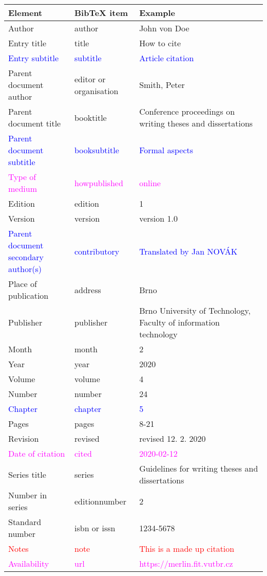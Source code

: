 \begin{tabularx}{\linewidth}{X X X}
    Element & BibTeX item & Example\\\hline
    Author & author & John von Doe\\
    Entry title & title & How to cite\\
    \textcolor{blue}{Entry subtitle} & \textcolor{blue}{subtitle} & \textcolor{blue}{Article citation}\\
    Parent document author & editor or organisation & Smith, Peter\\
    Parent document title & booktitle & Conference proceedings on writing theses and dissertations\\
    \textcolor{blue}{Parent document subtitle} & \textcolor{blue}{booksubtitle} & \textcolor{blue}{Formal aspects}\\
    \textcolor{magenta}{Type of medium} & \textcolor{magenta}{howpublished} & \textcolor{magenta}{online}\\
    Edition & edition & 1\\
    Version & version & version 1.0\\
    \textcolor{blue}{Parent document secondary author(s)} & \textcolor{blue}{contributory} & \textcolor{blue}{Translated by Jan NOVÁK}\\
    Place of publication & address & Brno\\
    Publisher & publisher & Brno University of Technology, Faculty of information technology\\
    Month & month & 2\\
    Year & year & 2020\\
    Volume & volume & 4\\
    Number & number & 24\\
    \textcolor{blue}{Chapter} & \textcolor{blue}{chapter} & \textcolor{blue}{5}\\
    Pages & pages & 8-21\\
    Revision & revised & revised 12. 2. 2020\\
    \textcolor{magenta}{Date of citation} & \textcolor{magenta}{cited} & \textcolor{magenta}{2020-02-12}\\
    Series title & series & Guidelines for writing theses and dissertations\\
    Number in series & editionnumber & 2\\
    Standard number & isbn or issn & 1234-5678\\
    \textcolor{red}{Notes} & \textcolor{red}{note} & \textcolor{red}{This is a made up citation}\\
    \textcolor{magenta}{Availability} & \textcolor{magenta}{url} & \textcolor{magenta}{https://merlin.fit.vutbr.cz}\\
\end{tabularx}

